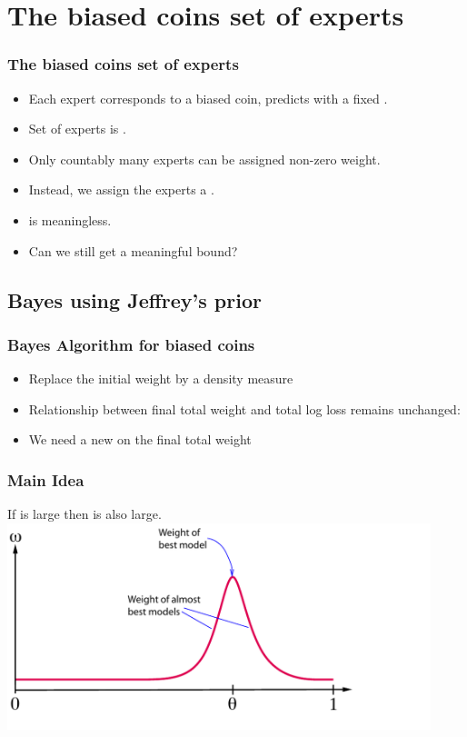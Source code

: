 \documentclass[handout]{beamer}
\begin{document}
\section{The biased coins set of experts}
\begin{frame}
\frametitle{The biased coins set of experts}
\begin{itemize}
\item Each expert corresponds to a biased coin, predicts with a fixed \R{$\theta \in [0,1]$}.
\item Set of experts is .
\item Only countably many experts can be assigned non-zero weight.
\item Instead, we assign the experts a .
\item {} is meaningless.
\item Can we still get a meaningful bound?
\end{itemize}
\end{frame}

\subsection{Bayes using Jeffrey's prior}

\begin{frame}
\frametitle{Bayes Algorithm for biased coins}
\begin{itemize}
\item 
Replace the initial weight by a density measure 
\item 
Relationship between final total weight and total log loss remains unchanged:
\R{\[
 \TAloss = \ln \int_0^1 \dweight{\theta}{} e^{-\TEloss{\theta}^{T+1}} d\theta
\]}
\item
We need a new  on the final total weight
\end{itemize}
\end{frame}

\begin{frame}
\frametitle{Main Idea}
If  is large then  is also large.
~\pause
\includegraphics[height=6cm]{figures/neighborhood.pdf}
\end{frame}
\end{document}
